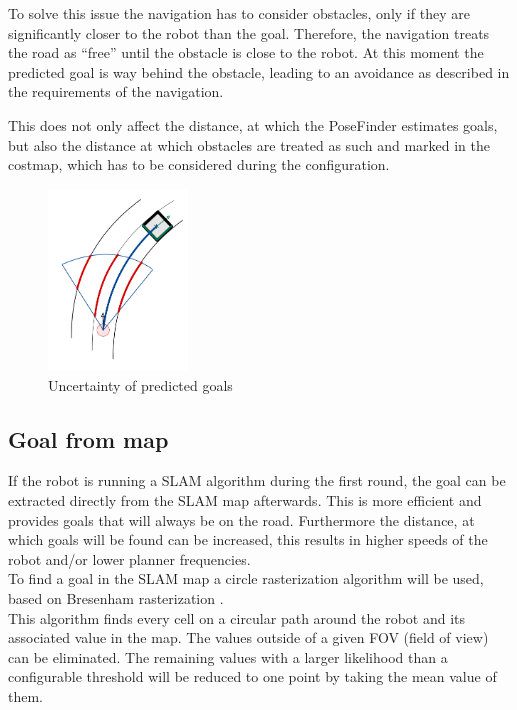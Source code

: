 To solve this issue the navigation has to consider obstacles, only if they are significantly closer to the robot than the goal. Therefore, the navigation treats the road as ``free'' until the obstacle is close to the robot. At this moment the predicted goal is way behind the obstacle, leading to an avoidance as described in the requirements of the navigation.

This does not only affect the distance, at which the PoseFinder estimates goals, but also the distance at which obstacles are treated as such and marked in the costmap, which has to be considered during the configuration.

\begin{figure}
\centering
	\includegraphics[width=0.33\textwidth]{Pictures/finding goal in obstacle}
	\caption{Uncertainty of predicted goals}
	\label{goaluncertainty}
\end{figure}


\subsection{Goal from map}

If the robot is running a SLAM algorithm during the first round, the goal can be extracted directly from the SLAM map afterwards. This is more efficient and provides goals that will always be on the road. Furthermore the distance, at which goals will be found can be increased, this results in higher speeds of the robot and/or lower planner frequencies.\\

To find a goal in the SLAM map a circle rasterization algorithm will be used, based on Bresenham rasterization \cite{ComputerGraphics}.\\

This algorithm finds every cell on a circular path around the robot and its associated value in the map. The values outside of a given FOV (field of view) can be eliminated. The remaining values with a larger likelihood than a configurable threshold will be reduced to one point by taking the mean value of them.\\

